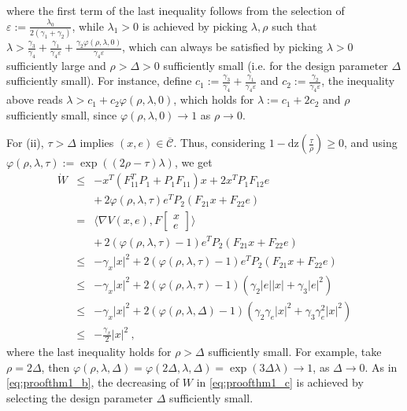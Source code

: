 \documentclass[twocolumn]{autart}
\newcommand{\smallmat}[1]{\left[ \begin{smallmatrix}#1
    \end{smallmatrix} \right]}
\newcommand\dz{\mathrm{dz}}
\begin{document}
{where the first term of the last inequality follows from 
the selection of $\varepsilon := \frac{\lambda_0}{2(\gamma_1 + \gamma_2)}$,
while $\lambda_1> 0$ is achieved by picking
$\lambda,\rho$ such that
$\lambda > \frac{\gamma_3}{\gamma_4} 
+\frac{\gamma_1}{\gamma_4\varepsilon}
+\frac{\gamma_2\varphi(\rho,\lambda,0)}{\gamma_4\varepsilon}$,
which can always be satisfied by picking $\lambda>0$ sufficiently large and 
$\rho> \Delta > 0$ sufficiently small (i.e. for the design parameter
$\Delta$ sufficiently small). 
For instance, define $c_1 := \frac{\gamma_3}{\gamma_4} 
+ \frac{\gamma_1}{\gamma_4\varepsilon}$ and
$c_2 :=  \frac{\gamma_2}{\gamma_4\varepsilon}$,
the inequality above reads 
$\lambda  > c_1 + c_2 \varphi(\rho,\lambda,0)$,
which holds for 
$\lambda := c_1+2c_2$ and $\rho$ sufficiently
small, since $\varphi(\rho,\lambda,0) \to 1$ as $\rho  \to 0$.
}  


For (ii), $\tau > \Delta$ implies $(x,e)\in\overline{\mathcal{C}}$.
Thus, considering $1-\dz(\frac{\tau}{\rho})\geq 0$, and
using $\varphi(\rho,\lambda,\tau) := \exp((2\rho-\tau)\lambda)$, 
we get
\begin{eqnarray}
\label{eq:proofthm1_c}
\dot{W} &\leq & -x^T(F_{11}^T P_1 + P_1F_{11})x + 2x^TP_1F_{12}e \\ \nonumber
& &+\, 2\varphi(\rho,\lambda,\tau)e^TP_2(F_{21}x + F_{22}e) \\ \nonumber
&= & 
 \langle\nabla V(x,\!e), F\smallmat{x \\ e}\rangle\\ \nonumber
& & +\, 2(\varphi(\rho,\lambda,\tau)-1)e^TP_2(F_{21}x + F_{22}e) \\ \nonumber
&\leq & -\gamma_x |x|^2
 + 2(\varphi(\rho,\lambda,\tau)-1)e^TP_2(F_{21}x + F_{22}e) \\ \nonumber
&\leq & -\gamma_x |x|^2
 + 2(\varphi(\rho,\lambda,\tau)-1)(\gamma_2|e||x| + \gamma_3|e|^2) \\ \nonumber
&\leq & -\gamma_x |x|^2
 + 2(\varphi(\rho,\lambda,\Delta)-1)(\gamma_2\gamma_e|x|^2 + \gamma_3\gamma_e^2|x|^2) \\ \nonumber
&\leq & -\frac{\gamma_x}{2} |x|^2 \ ,
\end{eqnarray}
{
where the last inequality holds for $\rho> \Delta$ sufficiently small.
For example, take $\rho = 2\Delta$, then
$\varphi(\rho,\lambda,\Delta) = \varphi(2\Delta,\lambda,\Delta)
= \exp(3\Delta\lambda) \to 1$, as $\Delta \to 0$.
As in \eqref{eq:proofthm1_b}, the decreasing of $W$ in
\eqref{eq:proofthm1_c} is achieved by selecting the design parameter
$\Delta$ sufficiently small. 
}
\end{document}
